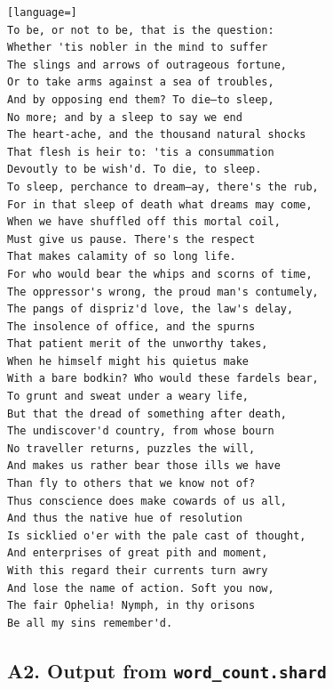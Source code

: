 \documentclass[twoside]{report}
\begin{document}
\begin{lstlisting}[language=]
To be, or not to be, that is the question:
Whether 'tis nobler in the mind to suffer
The slings and arrows of outrageous fortune,
Or to take arms against a sea of troubles,
And by opposing end them? To die—to sleep,
No more; and by a sleep to say we end
The heart-ache, and the thousand natural shocks
That flesh is heir to: 'tis a consummation
Devoutly to be wish'd. To die, to sleep.
To sleep, perchance to dream—ay, there's the rub,
For in that sleep of death what dreams may come,
When we have shuffled off this mortal coil,
Must give us pause. There's the respect
That makes calamity of so long life.
For who would bear the whips and scorns of time,
The oppressor's wrong, the proud man's contumely,
The pangs of dispriz'd love, the law's delay,
The insolence of office, and the spurns
That patient merit of the unworthy takes,
When he himself might his quietus make
With a bare bodkin? Who would these fardels bear,
To grunt and sweat under a weary life,
But that the dread of something after death,
The undiscover'd country, from whose bourn
No traveller returns, puzzles the will,
And makes us rather bear those ills we have
Than fly to others that we know not of?
Thus conscience does make cowards of us all,
And thus the native hue of resolution
Is sicklied o'er with the pale cast of thought,
And enterprises of great pith and moment,
With this regard their currents turn awry
And lose the name of action. Soft you now,
The fair Ophelia! Nymph, in thy orisons
Be all my sins remember'd.
\end{lstlisting}

\subsection{A2. Output from \texttt{word\_count.shard}}
\end{document}
